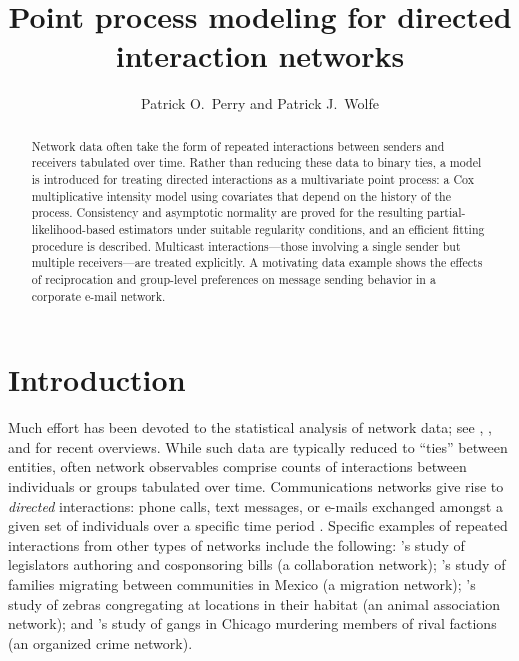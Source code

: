 \documentclass[final]{statsoc}
\title[Point Process Modeling for Directed Interaction Networks]{%
    Point process modeling for directed interaction networks
}
\author[P.\ O.\ Perry and P.\ J.\ Wolfe]{%
    Patrick O.\ Perry and Patrick J.\ Wolfe
}
\begin{document}

\begin{abstract}
Network data often take the form of repeated interactions between senders
and receivers tabulated over time.  Rather than reducing these data to
binary ties, a model is introduced for treating directed interactions as a
multivariate point process: a Cox multiplicative intensity model using
covariates that depend on the history of the process.
Consistency and asymptotic normality are proved for the resulting
partial-likelihood-based estimators under suitable regularity
conditions, and an efficient fitting procedure is described.
Multicast interactions---those involving a single sender
but multiple receivers---are treated explicitly.   A motivating data
example shows the effects of reciprocation and group-level preferences
on message sending behavior in a corporate e-mail network.

\end{abstract}


\section{Introduction}
\label{S:introduction}

Much effort has been devoted to the statistical analysis of network data;
see \citet{jackson2008social}, \citet{goldenberg2009survey}, and \citet{kolaczyk2009statistical}
for recent overviews.  While such data are typically reduced to ``ties''
between entities, often network observables comprise counts of interactions
between individuals or groups tabulated over time.  Communications networks
give rise to \emph{directed} interactions: phone calls, text messages, or
e-mails exchanged amongst a given set of individuals over a specific time
period \citep{tyler2005email,eagle2006reality}.  Specific examples of repeated
interactions from other types of networks include the following:
's \citeyearpar{fowler2006connecting}
study of legislators authoring and cosponsoring bills (a collaboration
network);
's \citeyearpar{mckenzie2007network} study
of families migrating between communities in Mexico (a migration network);
's \citeyearpar{sundaresan2007network}
study of zebras congregating at locations in
their habitat (an animal association network);
and 's \citeyearpar{papachristos2009murder}
study of gangs in Chicago murdering members of rival factions (an organized
crime network).
\end{document}
